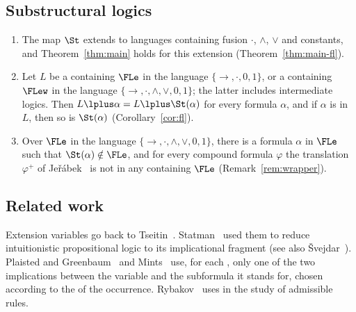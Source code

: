 \subsection{Substructural logics}

\begin{theorem}[informal]
\leavevmode
\begin{enumerate}
\item[(a)] The map $\St$ extends to languages containing fusion $\cdot$,
  $\wedge$, $\vee$ and constants, and Theorem~\ref{thm:main} holds for this
  extension (Theorem~\ref{thm:main-fl}).
\item[(b)] Let $L$ be a  containing $\FLe$ in the language
  $\{\to,\cdot,0,1\}$, or a  containing $\FLew$ in the language
  $\{\to,\cdot,\wedge,\vee,0,1\}$; the latter includes intermediate logics.
  Then $L\lplus\alpha=L\lplus\St(\alpha)$ for every formula $\alpha$, and
  if $\alpha$ is  in $L$, then so is $\St(\alpha)$
  (Corollary~\ref{cor:fl}).
\item[(c)] Over $\FLe$ in the language $\{\to,\cdot,\wedge,\vee,0,1\}$,
  there is a formula $\alpha$  in $\FLe$ such that
  $\St(\alpha)\notin\FLe$, and for every compound formula $\varphi$ the
  translation $\varphi^+$ of Jeřábek~\cite[Def.~3.6]{Jer16} is not
   in any  containing $\FLe$
  (Remark~\ref{rem:wrapper}).
\end{enumerate}
\end{theorem}

\subsection{Related work}\label{sec:related}

Extension variables go back to Tseitin~\cite{Tse68}. Statman~\cite{Sta79}
used them to reduce intuitionistic propositional logic to its
implicational fragment (see also Švejdar~\cite{Sve03}). Plaisted and
Greenbaum~\cite{PG86} and Mints~\cite{Min90} use, for each
, only one of the two implications between the
variable and the subformula it stands for, chosen according to the
 of the occurrence. Rybakov~\cite{Ryb97} uses
 in the study of admissible rules.

